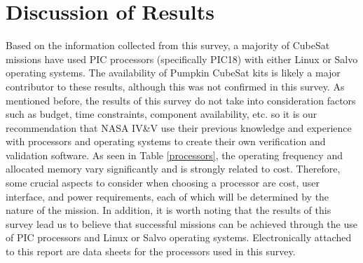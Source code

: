 \documentclass[11pt]{article}
\begin{document}
\section{Discussion of Results}
Based on the information collected from this survey, a majority of CubeSat missions have used PIC processors (specifically PIC18) with either Linux or Salvo operating systems.  The availability of Pumpkin CubeSat kits is likely a major contributor to these results, although this was not confirmed in this survey.  As mentioned before, the results of this survey do not take into consideration factors such as budget, time constraints, component availability, etc. so it is our recommendation that NASA IV\&V use their previous knowledge and experience with processors and operating systems to create their own verification and validation software.  As seen in Table \ref{processors}, the operating frequency and allocated memory vary significantly and is strongly related to cost.  Therefore, some crucial aspects to consider when choosing a processor are cost, user interface, and power requirements, each of which will be determined by the nature of the mission.  In addition, it is worth noting that the results of this survey lead us to believe that successful missions can be achieved through the use of PIC processors and Linux or Salvo operating systems.  Electronically attached to this report are data sheets for the processors used in this survey.

\begin{table}[h]
\centering
\caption{Processor Specifications}
\label{procspecs}
\end{table}
\end{document}

